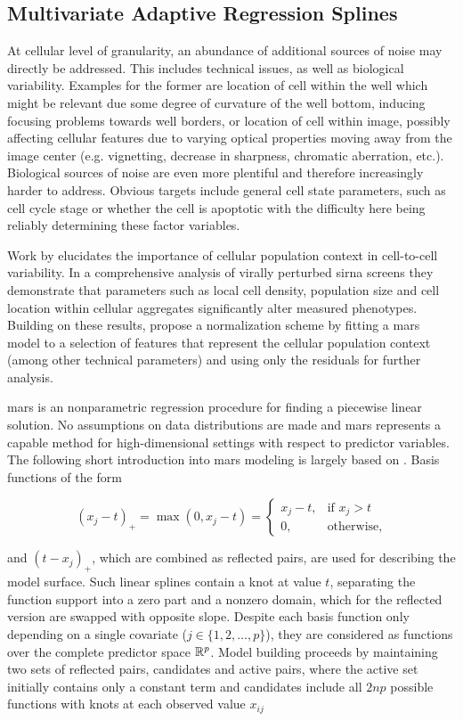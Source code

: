 \subsection{Multivariate Adaptive Regression Splines}
At cellular level of granularity, an abundance of additional sources of noise may directly be addressed. This includes technical issues, as well as biological variability. Examples for the former are location of cell within the well which might be relevant due some degree of curvature of the well bottom, inducing focusing problems towards well borders, or location of cell within image, possibly affecting cellular features due to varying optical properties moving away from the image center (e.g. vignetting, decrease in sharpness, chromatic aberration, etc.). Biological sources of noise are even more plentiful and therefore increasingly harder to address. Obvious targets include general cell state parameters, such as cell cycle stage or whether the cell is apoptotic with the difficulty here being reliably determining these factor variables.

Work by \citeauthor{Snijder2012} elucidates the importance of cellular population context in cell-to-cell variability. In a comprehensive analysis of virally perturbed \gls{sirna} screens they demonstrate that parameters such as local cell density, population size and cell location within cellular aggregates significantly alter measured phenotypes. Building on these results, \citeauthor{Knapp2011} propose a normalization scheme by fitting a \gls{mars} model to a selection of features that represent the cellular population context (among other technical parameters) and using only the residuals for further analysis.

\Gls{mars} is an nonparametric regression procedure for finding a piecewise linear solution. No assumptions on data distributions are made and \gls{mars} represents a capable method for high-dimensional settings with respect to predictor variables. The following short introduction into \gls{mars} modeling is largely based on \cite{Hastie2009}. Basis functions of the form

\begin{equation}
  (x_j-t)_+ = \max(0, x_j-t) =
  \begin{cases}
    x_j-t,& \text{if } x_j > t\\
    0,              & \text{otherwise},
  \end{cases}
\end{equation}

and $(t-x_j)_+$, which are combined as reflected pairs, are used for describing the model surface. Such linear splines contain a knot at value $t$, separating the function support into a zero part and a nonzero domain, which for the reflected version are swapped with opposite slope. Despite each basis function only depending on a single covariate ($j \in \{1, 2, \dotsc, p\}$), they are considered as functions over the complete predictor space $\mathbb{R}^p$. Model building proceeds by maintaining two sets of reflected pairs, candidates and active pairs, where the active set initially contains only a constant term and candidates include all $2np$ possible functions with knots at each observed value $x_{ij}$

